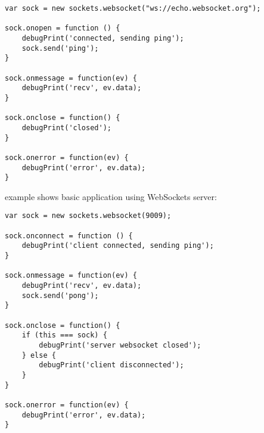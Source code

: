 \begin{lstlisting}
var sock = new sockets.websocket("ws://echo.websocket.org");

sock.onopen = function () {
    debugPrint('connected, sending ping');
    sock.send('ping');
}

sock.onmessage = function(ev) {
    debugPrint('recv', ev.data);
}

sock.onclose = function() {
    debugPrint('closed');
}

sock.onerror = function(ev) {
    debugPrint('error', ev.data);
}
\end{lstlisting}

 example shows basic application using WebSockets server:

\begin{lstlisting}
var sock = new sockets.websocket(9009);

sock.onconnect = function () {
    debugPrint('client connected, sending ping');
}

sock.onmessage = function(ev) {
    debugPrint('recv', ev.data);
    sock.send('pong');
}

sock.onclose = function() {
    if (this === sock) {
        debugPrint('server websocket closed');
    } else {
        debugPrint('client disconnected');
    }
}

sock.onerror = function(ev) {
    debugPrint('error', ev.data);
}
\end{lstlisting}


